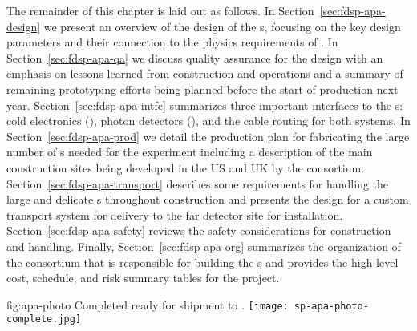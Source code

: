 The remainder of this chapter is laid out as follows.  In Section~\ref{sec:fdsp-apa-design} we present an overview of the design of the s, focusing on the key design parameters and their connection to the physics requirements of .  In Section~\ref{sec:fdsp-apa-qa} we discuss quality assurance for the design with an emphasis on lessons learned from  construction and operations and a summary of remaining prototyping efforts being planned before the start of production next year. Section~\ref{sec:fdsp-apa-intfc} summarizes three important interfaces to the s:  cold electronics (), photon detectors (), and the cable routing for both systems.  In Section~\ref{sec:fdsp-apa-prod} we detail the production plan for fabricating the large number of s needed for the experiment including a description of the main construction sites being developed in the US and UK by the  consortium.  Section~\ref{sec:fdsp-apa-transport} describes some requirements for handling the large and delicate s throughout construction and presents the design for a custom transport system for delivery to the far detector site for installation. Section~\ref{sec:fdsp-apa-safety} reviews the safety considerations for  construction and handling. Finally,  Section~\ref{sec:fdsp-apa-org} summarizes the organization of the  consortium that is responsible for building the s and provides the high-level cost, schedule, and risk summary tables for the project. 

\begin{dunefigure}{fig:apa-photo}
{Completed   ready for shipment to .}
\texttt{[image: sp-apa-photo-complete.jpg]}
\end{dunefigure}
